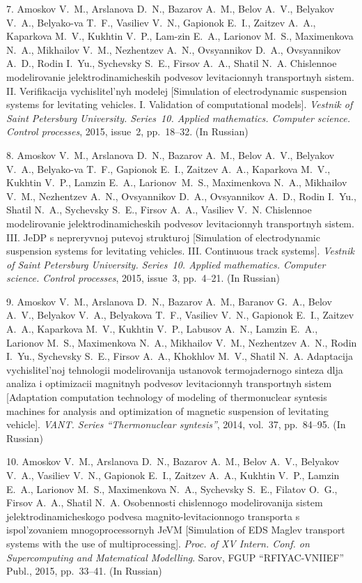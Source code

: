 {7. Amoskov V.~M., Arslanova D.~N., Bazarov A.~M., Belov A.~V.,
Belyakov V.~A., Belyako-\linebreak va T.~F., Vasiliev V.~N.,
Gapionok E.~I., Zaitzev A.~A., Kaparkova M.~V., Kukhtin V.~P.,
Lam-\linebreak zin E.~A., Larionov M.~S., Maximenkova  N.~A.,
Mikhailov V.~M., Nezhentzev A.~N., Ovsyannikov D.~A., Ovsyannikov
A.~D., Rodin I.~Yu., Sychevsky S.~E., Firsov A.~A., Shatil N.~A.
Chislennoe modelirovanie jelektrodinamicheskih podvesov
levitacionnyh transportnyh sistem. II. Verifikacija
vychislitel'nyh modelej [Simulation of electrodynamic suspension
systems for levitating vehicles. I. Validation of computational
models]. {\em Vestnik of Saint Petersburg University. Series~10.
Applied mathematics. Computer science. Control processes}, 2015,
issue~2, pp.~18--32. (In Russian)

8. Amoskov V.~M., Arslanova D.~N., Bazarov A.~M., Belov A.~V.,
Belyakov V.~A., Belyako-\linebreak va T.~F., Gapionok E.~I.,
Zaitzev A.~A., Kaparkova M.~V., Kukhtin V.~P., Lamzin E.~A.,
Larionov~M.~S., Maximenkova N.~A., Mikhailov V.~M., Nezhentzev
A.~N., Ovsyannikov D.~A., Ovsyannikov A.~D., Rodin I.~Yu., Shatil
N.~A., Sychevsky S.~E., Firsov A.~A., Vasiliev V.~N. Chislennoe
modelirovanie jelektrodinamicheskih podvesov levitacionnyh
transportnyh sistem. III. JeDP s nepreryvnoj putevoj strukturoj
[Simulation of electrodynamic suspension systems for levitating
vehicles. III. Continuous track systems]. {\em Vestnik of Saint
Petersburg University. Series~10. Applied mathematics. Computer
science. Control processes}, 2015, issue~3, pp.~4--21. (In
Russian)

9. Amoskov V.~M., Arslanova D.~N., Bazarov A.~M., Baranov G.~A.,
Belov A.~V., Belyakov V.~A., Belyakova T.~F., Vasiliev V.~N.,
Gapionok E.~I., Zaitzev A.~A., Kaparkova M.~V., Kukhtin V.~P.,
Labusov A.~N., Lamzin E.~A., Larionov M.~S., Maximenkova N.~A.,
Mikhailov V.~M., Nezhentzev A.~N., Rodin I.~Yu., Sychevsky S.~E.,
Firsov A.~A., Khokhlov M.~V., Shatil N.~A. Adaptacija
vychislitel'noj tehnologii modelirovanija ustanovok termojadernogo
sinteza dlja analiza i optimizacii magnitnyh podvesov
levitacionnyh transportnyh sistem [Adaptation computation
technology of modeling of thermonuclear syntesis machines for
analysis and optimization of magnetic suspension of levitating
vehicle]. {\em VANT. Series ``Thermonuclear syntesis''}, 2014,
vol.~37, pp.~84--95. (In Russian)

10. Amoskov V.~M., Arslanova D.~N., Bazarov A.~M., Belov A.~V.,
Belyakov V.~A., Vasiliev V.~N.,  Gapionok E.~I., Zaitzev A.~A.,
Kukhtin V.~P., Lamzin E.~A., Larionov M.~S., Maximenkova N.~A.,
Sychevsky S.~E., Filatov O.~G., Firsov A.~A., Shatil N.~A.
Osobennosti chislennogo modelirovanija sistem
jelektrodinamicheskogo podvesa magnito-levitacionnogo transporta s
ispol'zovaniem mnogoprocessornyh JeVM [Simulation of EDS Maglev
transport systems with the use of multiprocessing]. {\em Proc. of
XV Intern. Conf. on Supercomputing and Matematical Modelling}.
Sarov, FGUP ``RFIYAC-VNIIEF'' Publ., 2015, pp.~33--41. (In
Russian)

}

